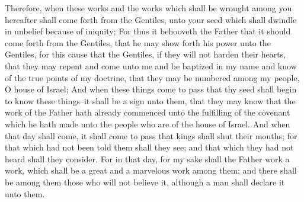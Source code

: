 \bverse \iffalse Therefore, when these works and the works which shall be wrought among you hereafter shall come forth from the Gentiles, unto your seed which shall dwindle in unbelief because of iniquity; \fi
Therefore, when these works and the works which shall be wrought among you hereafter shall come forth from the Gentiles, unto your seed which shall dwindle in unbelief because of iniquity;
\bverse \iffalse For thus it behooveth the Father that it should come forth from the Gentiles, that he may show forth his power unto the Gentiles, for this cause that the Gentiles, if they will not harden their hearts, that they may repent and come unto me and be baptized in my name and know of the true points of my doctrine, that they may be numbered among my people, O house of Israel; \fi
For thus it behooveth the Father that it should come forth from the Gentiles, that he may show forth his power unto the Gentiles, for this cause that the Gentiles, if they will not harden their hearts, that they may repent and come unto me and be baptized in my name and know of the true points of my doctrine, that they may be numbered among my people, O house of Israel;
\bverse \iffalse And when these things come to pass that thy seed shall begin to know these things--it shall be a sign unto them, that they may know that the work of the Father hath already commenced unto the fulfilling of the covenant which he hath made unto the people who are of the house of Israel. \fi
And when these things come to pass that thy seed shall begin to know these things--it shall be a sign unto them, that they may know that the work of the Father hath already commenced unto the fulfilling of the covenant which he hath made unto the people who are of the house of Israel.
\bverse \iffalse And when that day shall come, it shall come to pass that kings shall shut their mouths; for that which had not been told them shall they see; and that which they had not heard shall they consider. \fi
And when that day shall come, it shall come to pass that kings shall shut their mouths; for that which had not been told them shall they see; and that which they had not heard shall they consider.
\bverse \iffalse For in that day, for my sake shall the Father work a work, which shall be a great and a marvelous work among them; and there shall be among them those who will not believe it, although a man shall declare it unto them. \fi
For in that day, for my sake shall the Father work a work, which shall be a great and a marvelous work among them; and there shall be among them those who will not believe it, although a man shall declare it unto them.
